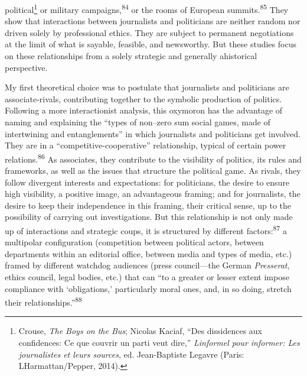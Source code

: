 \documentclass{tufte-handout}
\begin{document}
political\footnote{Crouse, \emph{The Boys on the Bus}; Nicolas Kaciaf,
  ``Des dissidences aux confidences: Ce que couvrir un parti veut
  dire,'' \emph{L\textquotesingle informel pour informer: Les
  journalistes et leurs sources}, ed. Jean-Baptiste Legavre (Paris:
  L\textquotesingle Harmattan/Pepper, 2014).} or military
campaigns,\textsuperscript{84} or the rooms
of European summits.\textsuperscript{85} They show that interactions
between journalists and politicians are neither random nor driven solely
by professional ethics. They are subject to permanent negotiations at
the limit of what is sayable, feasible, and newsworthy. But these
studies focus on these relationships from a solely strategic and
generally ahistorical perspective.

My first theoretical choice was to postulate that journalists and
politicians are associate-rivals, contributing together to the symbolic
production of politics. Following a more interactionist analysis, this
oxymoron has the advantage of naming and explaining the ``types of
non--zero sum social games, made of intertwining and entanglements'' in
which journalists and politicians get involved. They are in a
``competitive-cooperative'' relationship, typical of certain power
relations.\textsuperscript{86} As associates, they contribute to the
visibility of politics, its rules and frameworks, as well as the issues
that structure the political game. As rivals, they follow divergent
interests and expectations: for politicians, the desire to ensure high
visibility, a positive image, an advantageous framing; and for
journalists, the desire to keep their independence in this framing,
their critical sense, up to the possibility of carrying out
investigations. But this relationship is not only made up of
interactions and strategic coups, it is structured by different
factors:\textsuperscript{87} a multipolar
configuration (competition between political actors, between departments
within an editorial office, between media and types of media, etc.)
framed by different watchdog audiences (press council---the German
\emph{Presserat}, ethics council, legal bodies, etc.) that can ``to a
greater or lesser extent impose compliance with `obligations,'
particularly moral ones, and, in so doing, stretch their
relationships.''\textsuperscript{88}
\end{document}
